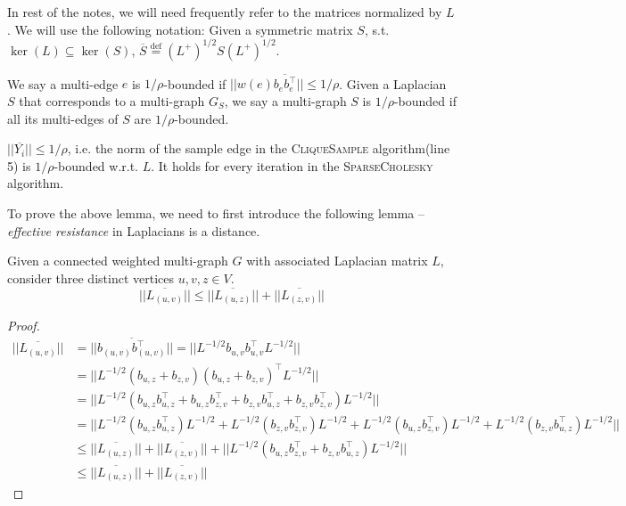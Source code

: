 \documentclass[11pt]{article}
\newcommand{\csamp}{\textsc{CliqueSample }}
\newcommand{\sparsecholesky}{\textsc{SparseCholesky }}
\newcommand{\lnorm}[1]{\ensuremath{\overline{#1}}}
\def\defeq{\stackrel{\mathrm{def}}{=}}
\begin{document}
\begin{definition}
In rest of the notes, we will need frequently refer to the matrices normalized by $L$. We will use the following notation: Given a symmetric matrix $S$, s.t. $\ker(L) \subseteq \ker(S)$, $\lnorm{S} \defeq (L^{+})^{1/2} S  (L^{+})^{1/2}$.

\end{definition}

\begin{definition}
  We say a multi-edge $e$ is $1/\rho$-bounded if $|| w(e) \lnorm{b_{e}b_{e}^{\top}} || \leq 1/\rho$. Given a Laplacian $S$ that corresponds to a multi-graph $G_S$, we say a multi-graph $S$ is $1/\rho$-bounded if all its multi-edges of $S$ are $1/\rho$-bounded. 

\end{definition}




\begin{lemma}\label{lem:bound}
  $||\lnorm{Y_i} || \leq 1/\rho$, i.e. the norm of the sample edge in the \csamp algorithm(line 5) is $1/\rho$-bounded w.r.t. $L$. It holds for every iteration in the \sparsecholesky algorithm. 
\end{lemma}

To prove the above lemma, we need to first introduce the following lemma -- \emph{effective resistance} in Laplacians is a distance\cite{Klein93}.

\begin{lemma}\label{lem:reffDist}
    Given a connected weighted multi-graph $G$ with associated Laplacian matrix $L$, consider three distinct vertices $u,v,z \in V$.
  \[
  || \lnorm{L_{(u,v)}} ||
  \leq 
  || \lnorm{L_{(u,z)}} ||
  +
  || \lnorm{L_{(z,v)}} ||
  \]
\end{lemma}

\begin{proof}


  \begin{align*}
    || \lnorm{L_{(u,v)}} || &= || \lnorm{b_{(u,v)} b_{(u,v)}^\top } || 
    = || L^{-1/2} b_{u,v} b_{u,v}^\top  L^{-1/2} || \\
    & =  || L^{-1/2} (b_{u,z} + b_{z,v}) (b_{u,z} + b_{z,v})^\top  L^{-1/2} || \\
    & = || L^{-1/2} (b_{u,z} b_{u,z}^\top + b_{u,z} b_{z,v}^\top + b_{z,v} b_{u,z}^\top + b_{z,v} b_{z,v}^\top)  L^{-1/2} || \\
    & = || L^{-1/2} (b_{u,z} b_{u,z}^\top) L^{-1/2} + L^{-1/2} (b_{z,v} b_{z,v}^\top) L^{-1/2} + L^{-1/2} (b_{u,z} b_{z,v}^\top) L^{-1/2} + L^{-1/2} (b_{z,v} b_{u,z}^\top) L^{-1/2} || \\
    & \leq || \lnorm{L_{(u,z)}} || + || \lnorm{L_{(z,v)}} || + || L^{-1/2} (b_{u,z} b_{z,v}^\top + b_{z,v} b_{u,z}^\top) L^{-1/2} ||  \\
    &\leq || \lnorm{L_{(u,z)}} || + || \lnorm{L_{(z,v)}} ||
\end{align*}

\end{proof}
\end{document}
